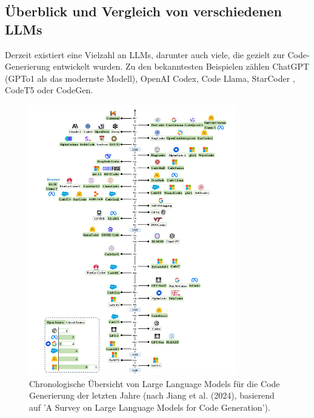 \documentclass[11pt,a4paper]{article}
\begin{document}
\subsection{Überblick und Vergleich von verschiedenen LLMs}
Derzeit existiert eine Vielzahl an LLMs, darunter auch viele, die gezielt zur Code-Generierung entwickelt wurden. Zu den bekanntesten Beispielen zählen ChatGPT (GPTo1 als das modernste Modell), OpenAI Codex, Code Llama\cite{rozière2024codellamaopenfoundation}, StarCoder \cite{li2023starcodersourceyou}, CodeT5\cite{wang2021codet5identifierawareunifiedpretrained} oder CodeGen\cite{nijkamp2023codegenopenlargelanguage}.
\begin{figure}[H]
    \centering
    \includegraphics[width=0.8\textwidth]{./bilder/LLMs_for_coding.png}
    \caption{Chronologische Übersicht von Large Language Models für die Code Generierung der letzten Jahre (nach Jiang et al. (2024), basierend auf 'A Survey on Large Language Models for Code Generation')\cite{jiang2024surveylargelanguagemodels}.}
    \label{fig:llms_for_coding}
\end{figure}
\end{document}
